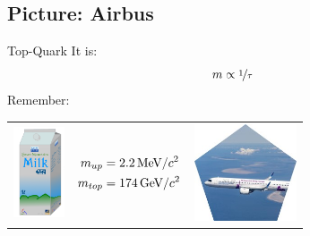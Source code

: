 \subsection{Picture: Airbus}
\begin{frame}{Top-Quark}
It is:
    \[ m \propto \nicefrac{1}{\tau} \] %
     Remember:

    \begin{table}[]
    \centering
    \begin{tabular}{ccc}
       \includegraphics[width=1.5cm]{Figures Lecture on Hadrons/SevenMountainsMilk.png}  &\parbox{4cm}{\vspace{-3cm}\begin{align*}m_{up}&= 2.2\,\textmd{MeV}/c^2 \\m_{top}&=174\,\textmd{GeV}/c^2 \end{align*}} & \includegraphics[width=3cm]{Figures Lecture on Hadrons/Airbus A321Neo.jpg}
       \end{tabular}  
\end{table} %

\begin{center}
     \\
   \end{center}
    \end{frame}
